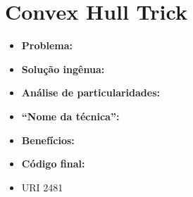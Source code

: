 \section{Convex Hull Trick}
\begin{itemize}
	\item \textbf{Problema:}
	\item \textbf{Solução ingênua:} 
	\item \textbf{Análise de particularidades:}
	\item \textbf{“Nome da técnica”:}
	\item \textbf{Benefícios:}
	\item \textbf{Código final:}
\end{itemize}
\begin{itemize}
	\item URI 2481
\end{itemize}

